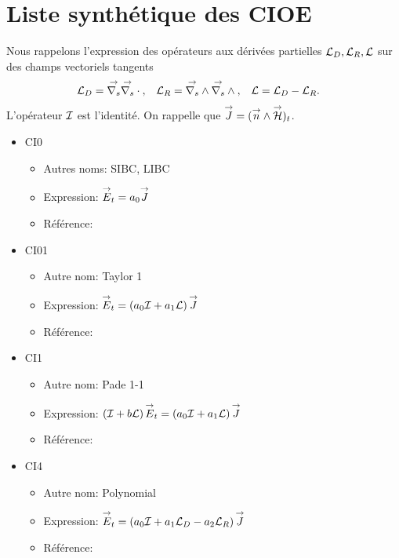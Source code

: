 \section{Liste synthétique des CIOE}

Nous rappelons l'expression des opérateurs aux dérivées partielles \({\mathcal{L}_D},{\mathcal{L}_R},\mathcal{L}\) sur des champs vectoriels tangents
\begin{align*}
  {\mathcal{L}_D} &= {\overset{\rightarrow}{\nabla_s}}{}{\overset{\rightarrow}{\nabla_s}} \cdot{}, &
  {\mathcal{L}_R} &= {\overset{\rightarrow}{\nabla_s}} \wedge{} {\overset{\rightarrow}{\nabla_s}} \wedge{}, &
  \mathcal{L} &= {\mathcal{L}_D} - {\mathcal{L}_R}.
\end{align*}
L'opérateur \({\mathcal{I}}\) est l'identité. On rappelle que \({\overset{\rightarrow}{J}} = ({\overset{\rightarrow}{n}} \wedge {\overset{\rightarrow}{\mathcal{H}}})_t\).

\begin{itemize}
  \item \hypertarget{ci0}{CI0}
  \begin{itemize}
    \item Autres noms: SIBC, LIBC
    \item Expression: \({\overset{\rightarrow}{E}}_t = a_0 {\overset{\rightarrow}{J}}\)
    \item Référence: \cite{leontovich_investigations_1948}
  \end{itemize}

  \item \hypertarget{ci01}{CI01}
  \begin{itemize}
    \item Autre nom: Taylor 1
    \item Expression: \({\overset{\rightarrow}{E}}_t = \left(a_0{\mathcal{I}} + a_1 \mathcal{L} \right){\overset{\rightarrow}{J}}\)
    \item Référence: \cite{stupfel_implementation_2015}
  \end{itemize}


  \item \hypertarget{ci1}{CI1}
  \begin{itemize}
    \item Autre nom: Pade 1-1
    \item Expression: \(\left({\mathcal{I}} + b \mathcal{L} \right){\overset{\rightarrow}{E}}_t = \left(a_0{\mathcal{I}} + a_1 \mathcal{L} \right){\overset{\rightarrow}{J}}\)
    \item Référence: \cite{stupfel_implementation_2015}
  \end{itemize}

  \item \hypertarget{ci4}{CI4}
  \begin{itemize}
    \item Autre nom: Polynomial
    \item Expression: \({\overset{\rightarrow}{E}}_t = \left(a_0{\mathcal{I}} + a_1 {\mathcal{L}_D} - a_2 {\mathcal{L}_R} \right){\overset{\rightarrow}{J}}\)
    \item Référence: \cite{hoppe_impedance_1995}
  \end{itemize}


\end{itemize}
